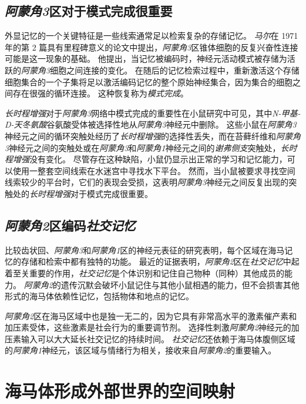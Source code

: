 \subsection{\textit{阿蒙角3}区对于模式完成很重要}

外显记忆的一个关键特征是一些线索通常足以检索复杂的存储记忆。
\textit{马尔}在 1971 年的第 2 篇具有里程碑意义的论文中提出，\textit{阿蒙角3}区锥体细胞的反复兴奋性连接可能是这一现象的基础\cite{marr1991simple}。
他提出，当记忆被编码时，神经元活动模式被存储为活跃的\textit{阿蒙角3}细胞之间连接的变化。
在随后的记忆检索过程中，重新激活这个存储细胞集合的一个子集将足以激活编码记忆的整个原始神经集合，因为集合的细胞之间存在很强的循环连接。
这种恢复称为\textit{模式完成}。


\textit{长时程增强}对于\textit{阿蒙角3}网络中模式完成的重要性在小鼠研究中可见，其中\textit{N-甲基-D-天冬氨酸}谷氨酸受体被选择性地从\textit{阿蒙角3}神经元中删除。
这些小鼠在\textit{阿蒙角3}神经元之间的循环突触处经历了\textit{长时程增强}的选择性丢失，而在苔藓纤维和\textit{阿蒙角3}神经元之间的突触处或在\textit{阿蒙角3}和\textit{阿蒙角1}神经元之间的\textit{谢弗侧支}突触处，\textit{长时程增强}没有变化。
尽管存在这种缺陷，小鼠仍显示出正常的学习和记忆能力，可以使用一整套空间线索在水迷宫中寻找水下平台。
然而，当小鼠被要求寻找空间线索较少的平台时，它们的表现会受损，这表明\textit{阿蒙角3}神经元之间反复出现的突触处的\textit{长时程增强}对于模式完成很重要。



\subsection{\textit{阿蒙角2}区编码\textit{社交记忆}}

比较齿状回、\textit{阿蒙角3}和\textit{阿蒙角1}区的神经元表征的研究表明，每个区域在海马记忆的存储和检索中都有独特的功能。
最近的证据表明，\textit{阿蒙角2}区在\textit{社交记忆}中起着至关重要的作用，\textit{社交记忆}是个体识别和记住自己物种（同种）其他成员的能力。
\textit{阿蒙角2}的遗传沉默会破坏小鼠记住与其他小鼠相遇的能力，但不会损害其他形式的海马体依赖性记忆，包括物体和地点的记忆。


\textit{阿蒙角2}区在海马区域中也是独一无二的，因为它具有非常高水平的激素催产素和加压素受体，这些激素是社会行为的重要调节剂。
选择性刺激\textit{阿蒙角2}神经元的加压素输入可以大大延长社交记忆的持续时间。
\textit{社交记忆}还依赖于海马体腹侧区域的\textit{阿蒙角1}神经元，该区域与情绪行为相关，接收来自\textit{阿蒙角2}的重要输入。



\section{海马体形成外部世界的空间映射}

